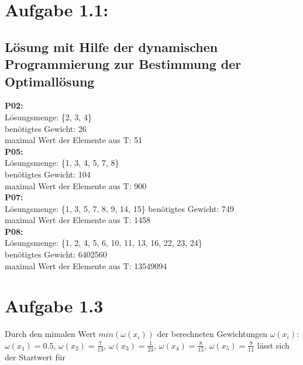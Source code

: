 \documentclass[a4paper,10pt]{article}
\begin{document}
\section*{Aufgabe 1.1:}
\subsection*{Lösung mit Hilfe der dynamischen Programmierung zur Bestimmung der Optimallösung}
\textbf{P02:}\\
Lösungsmenge: \{2, 3, 4\}\\
benötigtes Gewicht: 26\\
maximal Wert der Elemente aus T: 51\\
\textbf{P05:} \\
Lösungsmenge: \{1, 3, 4, 5, 7, 8\}\\
benötigtes Gewicht: 104 \\
maximal Wert der Elemente aus T: 900\\
\textbf{P07:} \\
Lösungsmenge: \{1, 3, 5, 7, 8, 9, 14, 15\}
benötigtes Gewicht: 749 \\
maximal Wert der Elemente aus T: 1458\\
\textbf{P08:} \\
Lösungsmenge: \{1, 2, 4, 5, 6, 10, 11, 13, 16, 22, 23, 24\}\\
benötigtes Gewicht: 6402560 \\
maximal Wert der Elemente aus T: 13549094

\section*{Aufgabe 1.3}
Durch den mimalen Wert $min(\omega(x_i))$ der berechneten Gewichtungen $\omega(x_i) $:\\
$\omega(x_1) = 0.5$, $\omega(x_2) = \frac{7}{13} $, $\omega(x_3) = \frac{1}{23} $, $\omega(x_4) = \frac{8}{15} $, $\omega(x_5) = \frac{9}{11}$
lässt sich der Startwert für 
\end{document}
